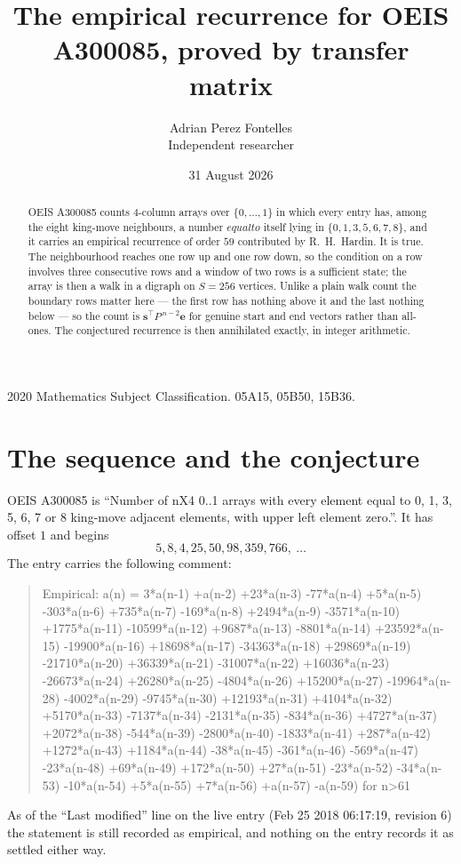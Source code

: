 \documentclass[11pt,a4paper]{article}
\title{The empirical recurrence for OEIS A300085, proved by transfer matrix}
\author{Adrian Perez Fontelles\\ \small Independent researcher}
\date{31 August 2026}
\theoremstyle{plain}
\theoremstyle{definition}
\begin{document}
\maketitle

\begin{abstract}
OEIS A300085 counts $4$-column arrays over $\{0,\dots,1\}$ in which every entry has,
among the eight king-move neighbours, a number $equal to$ itself lying in $\{0,1,3,5,6,7,8\}$, and it carries an empirical
recurrence of order $59$ contributed by R.~H.~Hardin. It is true. The neighbourhood
reaches one row up and one row down, so the condition on a row involves three consecutive
rows and a window of two rows is a sufficient state; the array is then a walk in a digraph
on $S=256$ vertices. Unlike a plain walk count the boundary rows matter here --- the first
row has nothing above it and the last nothing below --- so the count is
$\mathbf{s}^{\!\top}P^{\,n-2}\mathbf{e}$ for genuine start and end vectors rather than
all-ones. The conjectured recurrence is then annihilated exactly, in integer arithmetic.
\end{abstract}

\noindent\small 2020 Mathematics Subject Classification. 05A15, 05B50, 15B36.\normalsize

\section{The sequence and the conjecture}

OEIS A300085 is ``Number of nX4 0..1 arrays with every element equal to 0, 1, 3, 5, 6, 7 or 8 king-move adjacent elements, with upper left element zero.''. It has offset
$1$ and begins
\[
5, 8, 4, 25, 50, 98, 359, 766,\ \dots
\]
The entry carries the following comment:
\begin{quote}\small
Empirical: a(n) = 3*a(n-1) +a(n-2) +23*a(n-3) -77*a(n-4) +5*a(n-5) -303*a(n-6) +735*a(n-7) -169*a(n-8) +2494*a(n-9) -3571*a(n-10) +1775*a(n-11) -10599*a(n-12) +9687*a(n-13) -8801*a(n-14) +23592*a(n-15) -19900*a(n-16) +18698*a(n-17) -34363*a(n-18) +29869*a(n-19) -21710*a(n-20) +36339*a(n-21) -31007*a(n-22) +16036*a(n-23) -26673*a(n-24) +26280*a(n-25) -4804*a(n-26) +15200*a(n-27) -19964*a(n-28) -4002*a(n-29) -9745*a(n-30) +12193*a(n-31) +4104*a(n-32) +5170*a(n-33) -7137*a(n-34) -2131*a(n-35) -834*a(n-36) +4727*a(n-37) +2072*a(n-38) -544*a(n-39) -2800*a(n-40) -1833*a(n-41) +287*a(n-42) +1272*a(n-43) +1184*a(n-44) -38*a(n-45) -361*a(n-46) -569*a(n-47) -23*a(n-48) +69*a(n-49) +172*a(n-50) +27*a(n-51) -23*a(n-52) -34*a(n-53) -10*a(n-54) +5*a(n-55) +7*a(n-56) +a(n-57) -a(n-59) for n>61
\end{quote}
As of the ``Last modified'' line on the live entry (Feb 25 2018 06:17:19, revision
6) the statement is still recorded as empirical, and nothing on the entry
records it as settled either way.
\end{document}
